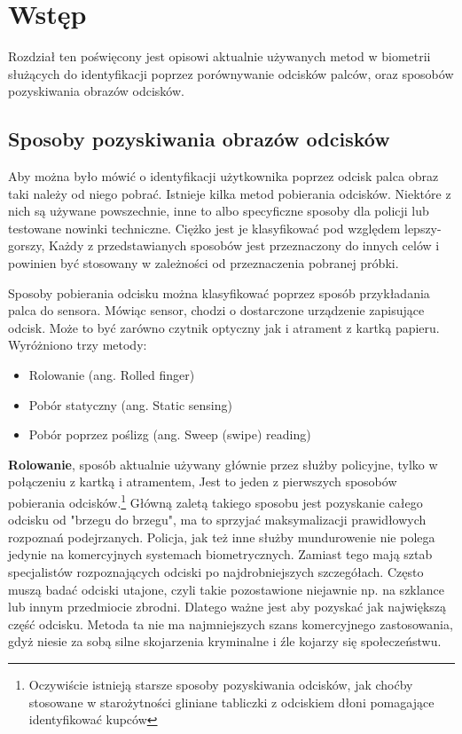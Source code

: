 \chapter{Wstęp}

Rozdział ten poświęcony jest opisowi aktualnie używanych metod w biometrii służących do 
identyfikacji poprzez porównywanie odcisków palców, oraz sposobów pozyskiwania obrazów odcisków.

\section[Sposoby pozyskiwania obrazów odcisków][Sposoby pozyskiwania obrazów odcisków]{Sposoby pozyskiwania obrazów odcisków}

Aby można było mówić o identyfikacji użytkownika poprzez odcisk palca obraz taki należy od niego pobrać. Istnieje kilka metod pobierania odcisków. Niektóre z nich są używane powszechnie, inne to albo specyficzne sposoby dla policji lub testowane nowinki techniczne. Ciężko jest je klasyfikować pod względem lepszy-gorszy, Każdy z przedstawianych sposobów jest przeznaczony do innych celów i powinien być stosowany w zależności od przeznaczenia pobranej próbki.

\vspace{.5cm}\par
Sposoby pobierania odcisku można klasyfikować poprzez sposób przykładania palca do sensora. Mówiąc sensor, chodzi o dostarczone urządzenie zapisujące odcisk. Może to być zarówno czytnik optyczny jak i atrament z kartką papieru. Wyróżniono trzy metody:

\renewcommand*{\labelitemi}{\bullet}
\begin{itemize}
	\item Rolowanie (ang. Rolled finger)
	\item Pobór statyczny (ang. Static sensing)
	\item Pobór poprzez poślizg (ang. Sweep (swipe) reading)
\end{itemize}
\vspace{.5cm}\par

\textbf{Rolowanie}, sposób aktualnie używany głównie przez służby policyjne, tylko w połączeniu z kartką i atramentem, Jest to jeden z pierwszych sposobów pobierania odcisków.\footnote{Oczywiście istnieją starsze sposoby pozyskiwania odcisków, jak choćby stosowane w starożytności gliniane tabliczki z odciskiem dłoni pomagające identyfikować kupców} Główną zaletą takiego sposobu jest pozyskanie całego odcisku od "brzegu do brzegu", ma to sprzyjać maksymalizacji prawidłowych rozpoznań podejrzanych. Policja, jak też inne służby mundurowenie nie polega jedynie na komercyjnych systemach biometrycznych. Zamiast tego mają sztab specjalistów rozpoznających odciski po najdrobniejszych szczegółach. Często muszą badać odciski utajone, czyli takie pozostawione niejawnie np. na szklance lub innym przedmiocie zbrodni. Dlatego ważne jest aby pozyskać jak największą część odcisku. Metoda ta nie ma najmniejszych szans komercyjnego zastosowania, gdyż niesie za sobą silne skojarzenia kryminalne i źle kojarzy się społeczeństwu. 
\vspace{.5cm}\par

